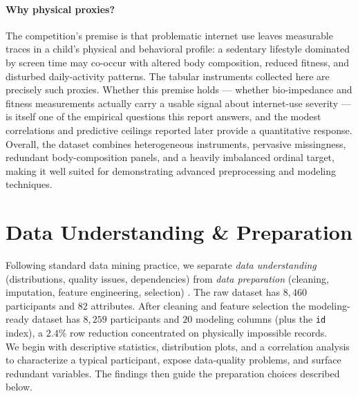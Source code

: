 \paragraph{Why physical proxies?} The competition's premise is that problematic internet use leaves measurable traces in a child's physical and behavioral profile: a sedentary lifestyle dominated by screen time may co-occur with altered body composition, reduced fitness, and disturbed daily-activity patterns. The tabular instruments collected here are precisely such proxies. Whether this premise holds --- whether bio-impedance and fitness measurements actually carry a usable signal about internet-use severity --- is itself one of the empirical questions this report answers, and the modest correlations and predictive ceilings reported later provide a quantitative response.\\

Overall, the dataset combines heterogeneous instruments, pervasive missingness, redundant body-composition panels, and a heavily imbalanced ordinal target, making it well suited for demonstrating advanced preprocessing and modeling techniques.

\section{Data Understanding \& Preparation}
Following standard data mining practice, we separate \emph{data understanding} (distributions, quality issues, dependencies) from \emph{data preparation} (cleaning, imputation, feature engineering, selection) \cite{intro}. The raw dataset has $8{,}460$ participants and $82$ attributes. After cleaning and feature selection the modeling-ready dataset has $8{,}259$ participants and $20$ modeling columns (plus the \texttt{id} index), a $2.4\%$ row reduction concentrated on physically impossible records.\\

We begin with descriptive statistics, distribution plots, and a correlation analysis to characterize a typical participant, expose data-quality problems, and surface redundant variables. The findings then guide the preparation choices described below.\\

